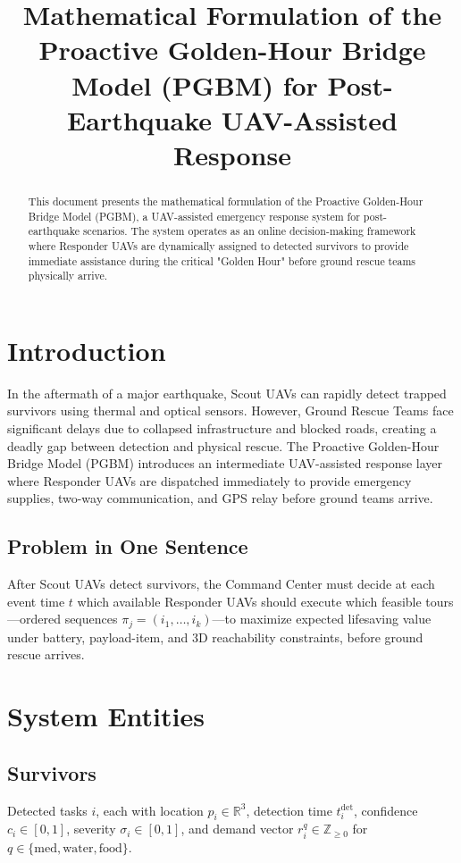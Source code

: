 \documentclass[conference]{IEEEtran}
\title{Mathematical Formulation of the Proactive Golden-Hour Bridge Model (PGBM) for Post-Earthquake UAV-Assisted Response}
\author{\IEEEauthorblockN{Author Name}
\IEEEauthorblockA{\textit{Department of Computer Science and Engineering}\\
\textit{University Name}\\
Email: author@email.com}
}
\begin{document}
\maketitle

\begin{abstract}
This document presents the mathematical formulation of the Proactive Golden-Hour Bridge Model (PGBM), a UAV-assisted emergency response system for post-earthquake scenarios. The system operates as an online decision-making framework where Responder UAVs are dynamically assigned to detected survivors to provide immediate assistance during the critical "Golden Hour" before ground rescue teams physically arrive.
\end{abstract}

\section{Introduction}

In the aftermath of a major earthquake, Scout UAVs can rapidly detect trapped survivors using thermal and optical sensors. However, Ground Rescue Teams face significant delays due to collapsed infrastructure and blocked roads, creating a deadly gap between detection and physical rescue. The Proactive Golden-Hour Bridge Model (PGBM) introduces an intermediate UAV-assisted response layer where Responder UAVs are dispatched immediately to provide emergency supplies, two-way communication, and GPS relay before ground teams arrive.

\subsection{Problem in One Sentence}
After Scout UAVs detect survivors, the Command Center must decide at each event time $t$ which available Responder UAVs should execute which feasible tours---ordered sequences $\pi_j=(i_1,\dots,i_k)$---to maximize expected lifesaving value under battery, payload-item, and 3D reachability constraints, before ground rescue arrives.

\section{System Entities}

\subsection{Survivors}
Detected tasks $i$, each with location $p_i\in\mathbb{R}^3$, detection time $t_i^{\text{det}}$, confidence $c_i\in[0,1]$, severity $\sigma_i\in[0,1]$, and demand vector $r_i^q\in\mathbb{Z}_{\ge0}$ for $q\in\{\text{med},\text{water},\text{food}\}$.
\end{document}
